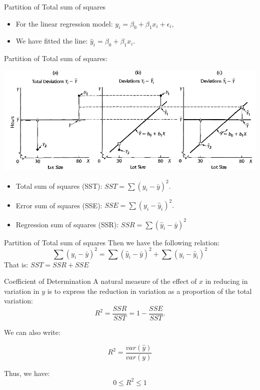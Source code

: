 \documentclass[
  ignorenonframetext,
]{beamer}
\begin{document}
\begin{frame}{Partition of Total sum of squares}
\protect\hypertarget{partition-of-total-sum-of-squares}{}
\begin{itemize}
\item
  For the linear regression model:
  \(y_i=\beta_0+\beta_1x_i+\epsilon_i,\)
\item
  We have fitted the line: \(\hat{y}_i=\beta_0+\beta_1x_i.\)
\end{itemize}

Partition of Total sum of squares:

\small

\begin{center}\includegraphics[width=0.65\linewidth]{week2_5} \end{center}
\normalsize

\begin{itemize}
\item
  Total sum of squares (SST): \(SST=\sum(y_i-\bar{y})^2.\)
\item
  Error sum of squares (SSE): \(SSE=\sum (y_i-\hat{y}_i)^2.\)
\item
  Regression sum of squares (SSR): \(SSR=\sum (\hat{y}_i-\bar{y})^2\)
\end{itemize}
\end{frame}

\begin{frame}{Partition of Total sum of squares}
\protect\hypertarget{partition-of-total-sum-of-squares-1}{}
Then we have the following relation:
\[\sum(y_i-\bar{y})^2=\sum (\hat{y}_i-\bar{y})^2+\sum (y_i-\hat{y}_i)^2\]
That is: \(SST=SSR+SSE\)
\end{frame}

\begin{frame}{Coefficient of Determination}
\protect\hypertarget{coefficient-of-determination}{}
A natural measure of the effect of \(x\) in reducing in variation in
\(y\) is to express the reduction in variation as a proportion of the
total variation: \[R^2=\frac{SSR}{SST}=1-\frac{SSE}{SST}.\]

We can also write:

\[R^2=\frac{var(\hat{y})}{var(y)}\]

Thus, we have: \[0\leq R^2 \leq 1\]
\end{frame}
\end{document}
